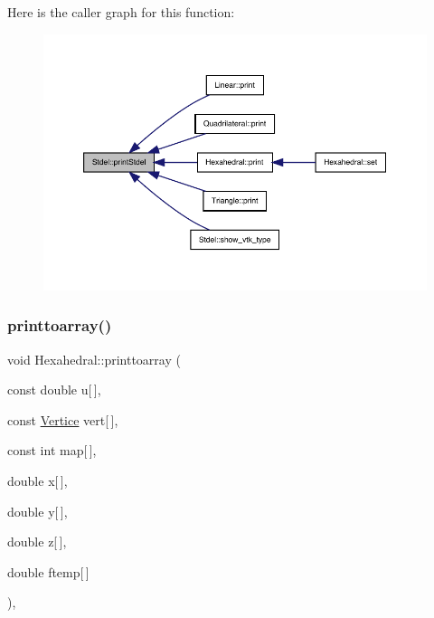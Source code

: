 Here is the caller graph for this function\+:
\nopagebreak
\begin{figure}[H]
\begin{center}
\leavevmode
\includegraphics[width=350pt]{classStdel_a54b5768d09f500cb949e66fc234eac70_icgraph}
\end{center}
\end{figure}
\mbox{\label{classHexahedral_a5e18ffc000cd95595f652d67ce21eeac}} 
\subsubsection{\texorpdfstring{printtoarray()}{printtoarray()}}
{\footnotesize\ttfamily void Hexahedral\+::printtoarray (\begin{DoxyParamCaption}\item[{const double}]{u\mbox{[}$\,$\mbox{]},  }\item[{const \hyperlink{structVertice}{Vertice}}]{vert\mbox{[}$\,$\mbox{]},  }\item[{const int}]{map\mbox{[}$\,$\mbox{]},  }\item[{double}]{x\mbox{[}$\,$\mbox{]},  }\item[{double}]{y\mbox{[}$\,$\mbox{]},  }\item[{double}]{z\mbox{[}$\,$\mbox{]},  }\item[{double}]{ftemp\mbox{[}$\,$\mbox{]} }\end{DoxyParamCaption})\hspace{0.3cm}{\ttfamily [private]}, {\ttfamily [virtual]}}



